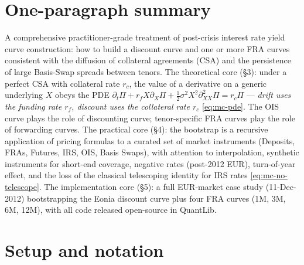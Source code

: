 \documentclass[11pt,a4paper]{article}
\begin{document}
\section*{One-paragraph summary}
A comprehensive practitioner-grade treatment of post-crisis interest
rate yield curve construction: how to build a discount curve and one
or more FRA curves consistent with the diffusion of collateral
agreements (CSA) and the persistence of large Basis-Swap spreads
between tenors. The theoretical core (\S3): under a perfect CSA with
collateral rate $r_c$, the value of a derivative on a generic
underlying $X$ obeys the PDE $\partial_t \Pi + r_f X \partial_X \Pi +
\tfrac12 \sigma^2 X^2 \partial^2_{XX}\Pi = r_c \Pi$ ---
\emph{drift uses the funding rate $r_f$, discount uses the collateral
rate $r_c$} \eqref{eq:mc-pde}. The OIS curve plays the role of
discounting curve; tenor-specific FRA curves play the role of
forwarding curves. The practical core (\S4): the bootstrap is a
recursive application of pricing formulas to a curated set of market
instruments (Deposits, FRAs, Futures, IRS, OIS, Basis Swaps), with
attention to interpolation, synthetic instruments for short-end
coverage, negative rates (post-2012 EUR), turn-of-year effect, and
the loss of the classical telescoping identity for IRS rates
\eqref{eq:mc-no-telescope}. The implementation core (\S5): a full
EUR-market case study (11-Dec-2012) bootstrapping the Eonia
discount curve plus four FRA curves (1M, 3M, 6M, 12M), with all code
released open-source in QuantLib.

\section{Setup and notation}
\end{document}
